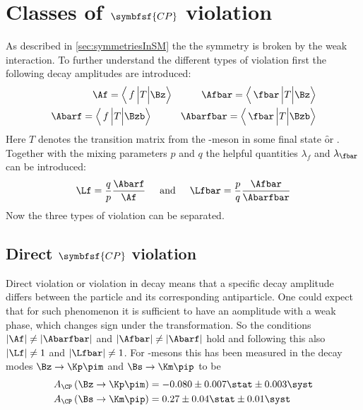 \section[head={Types of \CP violation},tocentry={Classes of \CP violation}]{Classes of $\symbfsf{C{}P}$ violation}
\label{sec:CPVClasses}

As described in \cref{sec:symmetriesInSM} the the \CP symmetry is broken by the weak interaction. To further understand
the different types of \CP violation first the following decay amplitudes are introduced:
\begin{equation}
\begin{split}
\Af = \left<\,f\,\Big|T\Big|\Bz\right>\hspace{1cm}\Afbar = \left<\,\fbar\,\Big|T\Big|\Bz\right>\\
\Abarf = \left<\,f\,\Big|T\Big|\Bzb\right>\hspace{1cm}\Abarfbar = \left<\,\fbar\,\Big|T\Big|\Bzb\right>
\end{split}
\end{equation}
Here $T$ denotes the transition matrix from the \B-meson in some final state \f or \fbar. Together with the
mixing parameters $p$ and $q$ the helpful quantities $\lambda_f$ and $\lambda_{\fbar}$ can be introduced:
\begin{equation}
\Lf=\frac{q}{p}\frac{\Abarf}{\Af}\hspace{0.5cm}\text{and}
\hspace{0.5cm}\Lfbar=\frac{p}{q}\frac{\Afbar}{\Abarfbar}
\end{equation}
Now the three types of \CP violation can be separated.

\subsection[head={Direct \CP violation},tocentry={Direct \CP violation}]{Direct $\symbfsf{C{}P}$ violation}
\label{sec:DirectCPV}

Direct \CP violation or \CP violation in decay means that a specific decay amplitude differs between the particle and  its
corresponding antiparticle. One could expect that for such phenomenon it is sufficient to have an aomplitude with a weak phase,
which changes sign under the \CP transformation. So the conditions $\left|\Af\right|\neq\left|\Abarfbar\right|$ and
$\left|\Afbar\right|\neq\left|\Abarf\right|$ hold and following this also $\left|\Lf\right|\neq1$ and $\left|\Lfbar\right|\neq1$.
For \B-mesons this has been measured in the decay modes $\Bz\to\Kp\pim$ and $\Bs\to\Km\pip$ \cite{LHCb-PAPER-2013-018} to be
\begin{equation}
\begin{split}
A_{\CP}\left(\Bz\to\Kp\pim\right) &= -0.080\pm0.007\stat \pm 0.003\syst\\
A_{\CP}\left(\Bs\to\Km\pip\right) &= 0.27\pm0.04\stat \pm 0.01\syst
\end{split}
\end{equation}


